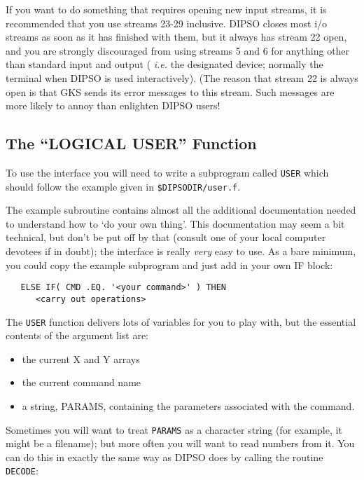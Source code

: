 If you want to do something that requires opening new input streams,
it is recommended that you use streams 23-29 inclusive. DIPSO closes
most i/o streams as soon as it has finished with them, but it always
has stream 22 open, and you are strongly discouraged from using
streams 5 and 6 for anything other than standard input and output ({\em
i.e.} the designated device; normally the terminal when DIPSO is used
interactively). (The reason that stream 22 is always open is that GKS
sends its error messages to this stream. Such messages are more likely
to annoy than enlighten DIPSO users!

\subsection {The ``LOGICAL USER'' Function}

To use the interface you will need to write a subprogram called
{\tt{USER}}  which should follow the example given in {\tt{\$DIPSODIR/user.f}}. 

The example subroutine contains almost all the additional
documentation needed to understand how to `do your own thing'. This
documentation may seem a bit technical, but don't be put off by that
(consult one of your local computer devotees if in doubt); the
interface is really {\em very} easy to use. As a bare minimum, you
could copy the example subprogram and just add in your own IF block:

\begin{verbatim}
   ELSE IF( CMD .EQ. '<your command>' ) THEN
      <carry out operations>
\end{verbatim}

The {\tt{USER}}  function delivers lots of variables for you to play
with, but the essential contents of the argument list are:

\begin{itemize}
\item the current X and Y arrays
\item the current command name
\item a string, PARAMS, containing the parameters associated with the command.
\end{itemize}

Sometimes you will want to treat {\tt{PARAMS}}  as a character string (for
example, it might be a filename); but more often you will want to
read numbers from it. You can do this in exactly the same way as DIPSO
does by calling the routine {\tt{DECODE}}: 

